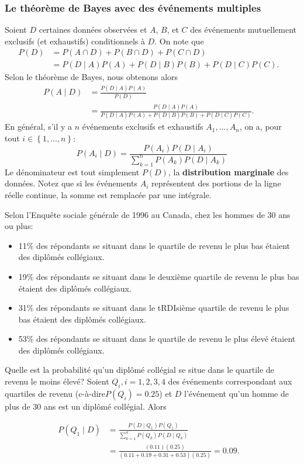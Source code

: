 \subsubsection*{Le théorème de Bayes avec des événements multiples}
Soient $D$ certaines données observées et $A$, $B$, et $C$ des événements mutuellement exclusifs (et exhaustifs) conditionnels à $D$. On note que 
\begin{equation*}
\begin{aligned}
P(D)&= P(A \cap D) + P(B \cap D)+P(C \cap D)  & \\
      &= P(D\mid A) P(A) + P(D\mid B) P(B) + P(D\mid C) P(C).&
\end{aligned}
\end{equation*}
Selon le théorème de Bayes, nous obtenons alors 
\begin{equation*}
\begin{aligned}
P(A\mid D)&= \frac{P(D\mid A) P(A)}{P(D)}  & \\
        &= \frac{P(D\mid A) P(A)}{P(D\mid A) P(A) + P(D\mid B) P(B) + P(D\mid C) P(C)}.&
\end{aligned}
\end{equation*}
En général, s'il y a $n$ \'ev\'enements exclusifs et exhaustifs $A_{1},..., A_{n}$, on a, pour tout $i\in\left\{1,..., n\right\}$: 
$$ P(A_{i}\mid D) = \frac{P(A_{i}) P(D\mid A_{i})}{\sum^{n}_{k=1} P(A_{k}) P(D\mid A_{k})} $$ 
Le dénominateur est tout simplement $P(D)$, la  \textbf{distribution marginale} des données. Notez que si les \'ev\'enements $A_{i}$ repr\'esentent des portions de la ligne réelle continue, la somme est remplacée par une intégrale.
\begin{Exemple}
Selon l'Enquête sociale générale de 1996 au Canada, chez les hommes de 30 ans ou plus:
\begin{itemize}[noitemsep]
\item 11\% des r\'epondants se situant dans le quartile de revenu le plus bas étaient des diplômés collégiaux.
\item 19\% des r\'epondants se situant dans le deuxième quartile de revenu le plus bas étaient des diplômés collégiaux.
\item 31\% des r\'epondants se situant dans le tRDIsième quartile de revenu le plus bas étaient des diplômés collégiaux.
\item 53\% des r\'epondants se situant dans le quartile de revenu le plus élevé étaient des diplômés collégiaux.
\end{itemize}
Quelle est la probabilité qu'un diplômé coll\'egial se situe dans le quartile de revenu le moins \'elev\'e? 
\newl Soient $Q_{i}, i =1, 2, 3, 4$ des \'ev\'enements correspondant aux quartiles de revenu (c-à-dire\@ $P(Q_{i}) =0.25$) et $D$ l'événement qu'un homme de plus de 30 ans est un diplômé coll\'egial. Alors

\begin{equation*}
\begin{aligned}
P(Q_{1}\mid D)&= \frac{P(D\mid Q_{1}) P(Q_{1})}{\sum^{4}_{k=1} P(Q_{k}) P(D\mid Q_{k})}  & \\
            &= \frac{(0.11)(0.25)}{(0.11+0.19+0.31+0.53)(0.25)} = 0.09.&
\end{aligned}
\end{equation*}
\end{Exemple}
